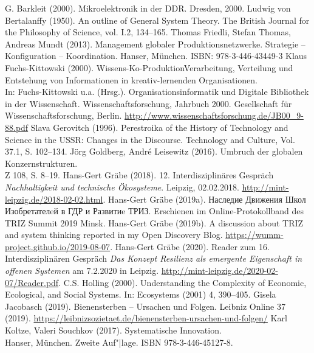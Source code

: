 \documentclass[11pt,a4paper]{article}
\begin{document}
\begin{thebibliography}{xxx}
 G. Barkleit (2000). Mikroelektronik in der
  DDR. Dresden, 2000.
 Ludwig von Bertalanffy (1950). An outline of General
  System Theory. The British Journal for the Philosophy of Science, vol. I.2,
  134–165.
 Thomas Friedli, Stefan Thomas, Andreas Mundt (2013).
  Management globaler Produktionsnetzwerke. Strategie – Konfiguration –
  Koordination. Hanser, München. ISBN: 978-3-446-43449-3
 Klaus Fuchs-Kittowski (2000).
  Wissens-Ko-ProduktionVerarbeitung, Verteilung und Entstehung von
  Informationen in kreativ-lernenden Organisationen.\\ In: Fuchs-Kittowski
  u.a. (Hrsg.). Organisationsinformatik und Digitale Bibliothek in der
  Wissenschaft. Wissenschaftsforschung, Jahrbuch 2000. Gesellschaft für
  Wissenschaftsforschung, Berlin.
  \url{http://www.wissenschaftsforschung.de/JB00_9-88.pdf}
 Slava Gerovitch (1996). Perestroika of the History of
  Technology and Science in the USSR: Changes in the Discourse. Technology and
  Culture, Vol. 37.1, S. 102--134.
 Jörg Goldberg, André Leisewitz (2016). Umbruch der
  globalen Konzernstrukturen.\\ Z 108, S. 8--19.
 Hans-Gert Gräbe (2018).  12. Interdisziplinäres Gespräch
  \emph{Nachhaltigkeit und technische Ökosysteme}. Leipzig, 02.02.2018. 
  \url{http://mint-leipzig.de/2018-02-02.html}.
 Hans-Gert Gräbe (2019a).
  \foreignlanguage{russian}{Наследие Движения Школ Изобретателeй в ГДР и
    Развитиe ТРИЗ.}  Erschienen im Online-Protokollband des TRIZ Summit 2019
  Minsk.
 Hans-Gert Gräbe (2019b).  A discussion about TRIZ
    and system thinking reported in my Open Discovery Blog.
    \url{https://wumm-project.github.io/2019-08-07}.
 Hans-Gert Gräbe (2020). Reader zum 16. Interdisziplinären
  Gespräch \emph{Das Konzept Resilienz als emergente Eigenschaft in offenen
    Systemen} am 7.2.2020 in Leipzig.
  \url{http://mint-leipzig.de/2020-02-07/Reader.pdf}.
 C.S. Holling (2000). Understanding the Complexity of
  Economic, Ecological, and Social Systems. In: Ecosystems (2001) 4, 390–405.
 Gisela Jacobasch (2019). Bienensterben -- Ursachen und
  Folgen.  Leibniz Online 37 (2019).
  \url{https://leibnizsozietaet.de/bienensterben-ursachen-und-folgen/}
 Karl Koltze, Valeri Souchkov (2017).  Systematische
  Innovation.\\ Hanser, München. Zweite Auf"|lage. ISBN 978-3-446-45127-8.

\end{thebibliography}
\end{document}

